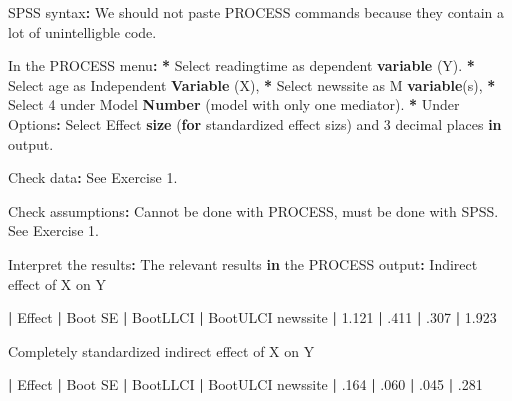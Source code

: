 \documentclass[a4paper]{book}
\newenvironment{Shaded}{\begin{snugshade}}{\end{snugshade}}
\newcommand{\KeywordTok}[1]{\textcolor[rgb]{0,0,0}{\textbf{#1}}}
\newcommand{\DecValTok}[1]{\textcolor[rgb]{0.00,0.00,0.00}{#1}}
\newcommand{\FloatTok}[1]{\textcolor[rgb]{0.00,0.00,0.00}{#1}}
\newcommand{\StringTok}[1]{\textcolor[rgb]{0.00,0.00,0.00}{#1}}
\newcommand{\ControlFlowTok}[1]{\textcolor[rgb]{0.00,0.00,0.00}{\textbf{#1}}}
\newcommand{\OperatorTok}[1]{\textcolor[rgb]{0.00,0.00,0.00}{\textbf{#1}}}
\newcommand{\ErrorTok}[1]{\textcolor[rgb]{0.00,0.00,0.00}{\textbf{#1}}}
\newcommand{\NormalTok}[1]{#1}
\theoremstyle{definition}
\theoremstyle{definition}
\theoremstyle{definition}
\theoremstyle{remark}
\begin{document}
\begin{Shaded}
\begin{Highlighting}[]
\NormalTok{SPSS syntax}\OperatorTok{:}\StringTok{  }
\StringTok{  }
\NormalTok{We should not paste PROCESS commands because they contain a lot of}
\NormalTok{unintelligble code.}
  
\NormalTok{In the PROCESS menu}\OperatorTok{:}\StringTok{  }
\StringTok{    }
\ErrorTok{*}\StringTok{ }\NormalTok{Select readingtime as dependent }\KeywordTok{variable}\NormalTok{ (Y).  }
\OperatorTok{*}\StringTok{ }\NormalTok{Select age as Independent }\KeywordTok{Variable}\NormalTok{ (X),  }
\OperatorTok{*}\StringTok{ }\NormalTok{Select newssite as M }\KeywordTok{variable}\NormalTok{(s),  }
\OperatorTok{*}\StringTok{ }\NormalTok{Select }\DecValTok{4}\NormalTok{ under Model }\KeywordTok{Number}\NormalTok{ (model with only one mediator).  }
\OperatorTok{*}\StringTok{ }\NormalTok{Under Options}\OperatorTok{:}\StringTok{ }\NormalTok{Select Effect }\KeywordTok{size}\NormalTok{ (}\ControlFlowTok{for}\NormalTok{ standardized effect sizs) }
\NormalTok{  and }\DecValTok{3}\NormalTok{ decimal places }\ControlFlowTok{in}\NormalTok{ output.}
  
\NormalTok{Check data}\OperatorTok{:}\StringTok{ }\NormalTok{See Exercise }\DecValTok{1}\NormalTok{.  }
  
\NormalTok{Check assumptions}\OperatorTok{:}\StringTok{ }\NormalTok{Cannot be done with PROCESS, must be done with SPSS. See}
\NormalTok{Exercise }\DecValTok{1}\NormalTok{.}
  
\NormalTok{Interpret the results}\OperatorTok{:}\StringTok{  }
\StringTok{  }
\NormalTok{The relevant results }\ControlFlowTok{in}\NormalTok{ the PROCESS output}\OperatorTok{:}\StringTok{  }
\StringTok{    }
\NormalTok{Indirect effect of X on Y  }

          \OperatorTok{|}\StringTok{  }\NormalTok{Effect   }\OperatorTok{|}\StringTok{  }\NormalTok{Boot SE  }\OperatorTok{|}\StringTok{  }\NormalTok{BootLLCI  }\OperatorTok{|}\StringTok{  }\NormalTok{BootULCI  }
\NormalTok{newssite  }\OperatorTok{|}\StringTok{  }\FloatTok{1.121}    \OperatorTok{|}\StringTok{  }\NormalTok{.}\DecValTok{411}     \OperatorTok{|}\StringTok{  }\NormalTok{.}\DecValTok{307}      \OperatorTok{|}\StringTok{  }\FloatTok{1.923}

\NormalTok{Completely standardized indirect effect of X on Y   }

          \OperatorTok{|}\StringTok{  }\NormalTok{Effect  }\OperatorTok{|}\StringTok{  }\NormalTok{Boot SE  }\OperatorTok{|}\StringTok{  }\NormalTok{BootLLCI  }\OperatorTok{|}\StringTok{  }\NormalTok{BootULCI  }
\NormalTok{newssite  }\OperatorTok{|}\StringTok{  }\NormalTok{.}\DecValTok{164}    \OperatorTok{|}\StringTok{  }\NormalTok{.}\DecValTok{060}     \OperatorTok{|}\StringTok{  }\NormalTok{.}\DecValTok{045}      \OperatorTok{|}\StringTok{  }\NormalTok{.}\DecValTok{281}  


\end{Highlighting}
\end{Shaded}
\end{document}
